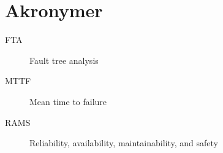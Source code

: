 \chapter{Akronymer}
\begin{description}
\item[FTA] Fault tree analysis
\item[MTTF] Mean time to failure
\item[RAMS] Reliability, availability, maintainability, and safety
\end{description}